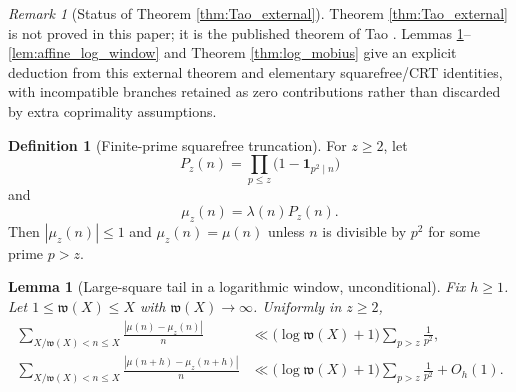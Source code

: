 \documentclass[11pt]{amsart}
\numberwithin{equation}{section}
\theoremstyle{plain}
\newtheorem{lemma}[theorem]{Lemma}
\theoremstyle{definition}
\newtheorem{definition}[theorem]{Definition}
\theoremstyle{remark}
\newtheorem{remark}[theorem]{Remark}
\newcommand{\one}{\mathbf 1}
\newcommand{\mob}{\mu}
\newcommand{\liou}{\lambda}
\newcommand{\what}{\mathfrak w}
\begin{document}
\begin{remark}[Status of Theorem \ref{thm:Tao_external}]
\label{rem:Tao_status}
Theorem \ref{thm:Tao_external} is not proved in this paper; it is the published theorem of Tao \cite{Tao2016}.  Lemmas \ref{lem:truncated_squarefree_tail}--\ref{lem:affine_log_window} and Theorem \ref{thm:log_mobius} give an explicit deduction from this external theorem and elementary squarefree/CRT identities, with incompatible branches retained as zero contributions rather than discarded by extra coprimality assumptions.
\end{remark}

\begin{definition}[Finite-prime squarefree truncation]
\label{def:mu_z}
For $z\ge2$, let
\begin{equation}
P_z(n)=\prod_{p\le z}\bigl(1-\one_{p^2\mid n}\bigr)
\label{eq:Pz_definition}
\end{equation}
and
\begin{equation}
\mob_z(n)=\liou(n)P_z(n).
\label{eq:mu_z_definition}
\end{equation}
Then $|\mob_z(n)|\le1$ and $\mob_z(n)=\mob(n)$ unless $n$ is divisible by $p^2$ for some prime $p>z$.
\end{definition}

\begin{lemma}[Large-square tail in a logarithmic window, unconditional]
\label{lem:truncated_squarefree_tail}
Fix $h\ge1$.  Let $1\le\what(X)\le X$ with $\what(X)\to\infty$.  Uniformly in $z\ge2$,
\begin{align}
\sum_{X/\what(X)<n\le X}
\frac{|\mob(n)-\mob_z(n)|}{n}
&\ll
\bigl(\log\what(X)+1\bigr)
\sum_{p>z}\frac1{p^2},
\label{eq:mu_tail_unshifted}\\
\sum_{X/\what(X)<n\le X}
\frac{|\mob(n+h)-\mob_z(n+h)|}{n}
&\ll
\bigl(\log\what(X)+1\bigr)
\sum_{p>z}\frac1{p^2}+O_h(1).
\label{eq:mu_tail_shifted}
\end{align}
\end{lemma}
\end{document}
